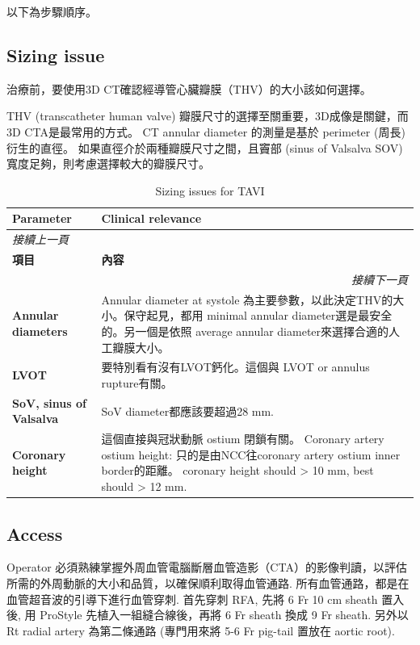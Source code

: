 \documentclass[nols]{tufte-book}
\begin{document}
以下為步驟順序。

\subsection{Sizing issue}
治療前，要使用3D CT確認經導管心臟瓣膜（THV）的大小該如何選擇。

THV (transcatheter human valve) 瓣膜尺寸的選擇至關重要，3D成像是關鍵，而3D CTA是最常用的方式。
CT annular diameter 的測量是基於 perimeter (周長)衍生的直徑。
如果直徑介於兩種瓣膜尺寸之間，且竇部 (sinus of Valsalva SOV) 寬度足夠，則考慮選擇較大的瓣膜尺寸。

\begin{longtable}{p{3cm} p{7cm}}
\caption{Sizing issues for TAVI}\\
\hline
\textbf{Parameter} & \textbf{Clinical relevance} \\
\hline
\endfirsthead
\multicolumn{2}{l}{\textit{接續上一頁}} \\
\hline
\textbf{項目} & \textbf{內容} \\
\hline
\endhead
\hline \multicolumn{2}{r}{\textit{接續下一頁}} \\
\endfoot
\endlastfoot

\textbf{Annular diameters} & 
Annular diameter at systole 為主要參數，以此決定THV的大小。保守起見，都用 minimal annular diameter選是最安全的。另一個是依照 average annular diameter來選擇合適的人工瓣膜大小。
\\ \hline

\textbf{LVOT} & 
要特別看有沒有LVOT鈣化。這個與 LVOT or annulus rupture有關。
\\ \hline

\textbf{SoV, sinus of Valsalva} &
SoV diameter都應該要超過28 mm. 
\\ \hline

\textbf{Coronary height} &
這個直接與冠狀動脈 ostium 閉鎖有關。
Coronary artery ostium height: 只的是由NCC往coronary artery ostium inner border的距離。
coronary height should > 10 mm, best should > 12 mm. 
\\ \hline

\end{longtable}


\subsection{Access}
Operator 必須熟練掌握外周血管電腦斷層血管造影（CTA）的影像判讀，以評估所需的外周動脈的大小和品質，以確保順利取得血管通路. 
所有血管通路，都是在血管超音波的引導下進行血管穿刺. 
首先穿刺 RFA, 先將 6 Fr 10 cm sheath 置入後, 用 ProStyle 先植入一組縫合線後，再將 6 Fr sheath 換成 9 Fr sheath. 
另外以 Rt radial artery 為第二條通路 (專門用來將 5-6 Fr pig-tail 置放在 aortic root).
\end{document}
